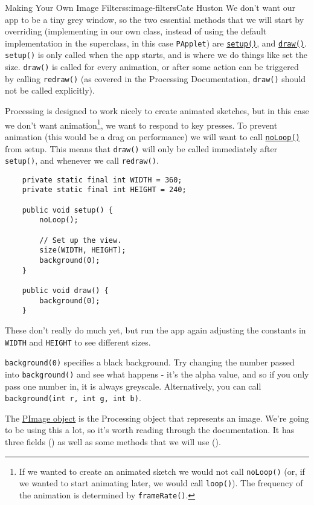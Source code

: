 \begin{aosachapter}{Making Your Own Image Filters}{s:image-filters}{Cate Huston}
We don't want our app to be a tiny grey window, so the two essential
methods that we will start by overriding (implementing in our own class,
instead of using the default implementation in the superclass, in this
case \texttt{PApplet}) are
\href{http://processing.org/reference/setup_.html}{\texttt{setup()}},
and \href{http://processing.org/reference/draw_.html}{\texttt{draw()}}.
\texttt{setup()} is only called when the app starts, and is where we do
things like set the size. \texttt{draw()} is called for every animation,
or after some action can be triggered by calling \texttt{redraw()} (as
covered in the Processing Documentation, \texttt{draw()} should not be
called explicitly).

Processing is designed to work nicely to create animated sketches, but
in this case we don't want animation\footnote{If we wanted to create an
  animated sketch we would not call \texttt{noLoop()} (or, if we wanted
  to start animating later, we would call \texttt{loop()}). The
  frequency of the animation is determined by \texttt{frameRate()}.}, we
want to respond to key presses. To prevent animation (this would be a
drag on performance) we will want to call
\href{http://www.processing.org/reference/noLoop_.html}{\texttt{noLoop()}}
from setup. This means that \texttt{draw()} will only be called
immediately after \texttt{setup()}, and whenever we call
\texttt{redraw()}.

\begin{verbatim}
    private static final int WIDTH = 360;
    private static final int HEIGHT = 240;

    public void setup() {
        noLoop();

        // Set up the view.
        size(WIDTH, HEIGHT);
        background(0);
    }
        
    public void draw() {
        background(0);
    }
\end{verbatim}

These don't really do much yet, but run the app again adjusting the
constants in \texttt{WIDTH} and \texttt{HEIGHT} to see different sizes.

\texttt{background(0)} specifies a black background. Try changing the
number passed into \texttt{background()} and see what happens - it's the
alpha value, and so if you only pass one number in, it is always
greyscale. Alternatively, you can call
\texttt{background(int r, int g, int b)}.

\label{pimage}

The \href{http://processing.org/reference/PImage.html}{PImage object} is
the Processing object that represents an image. We're going to be using
this a lot, so it's worth reading through the documentation. It has
three fields () as well as
some methods that we will use
().


\end{aosachapter}
